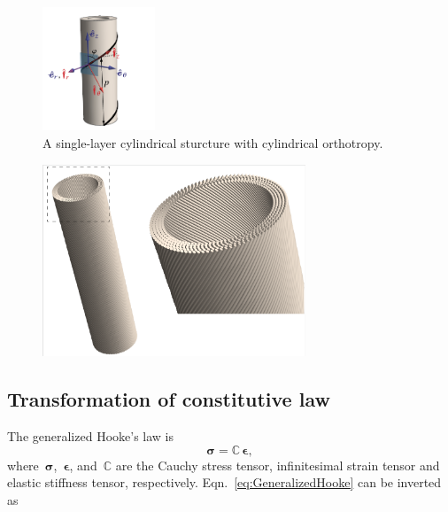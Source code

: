 \documentclass[preprint,12pt,times]{elsarticle}
\numberwithin{equation}{section}
\renewcommand{\u}[1]{\boldsymbol{#1}}
\renewcommand{\>}{$\Rightarrow$}
\begin{document}
\begin{figure}[t]
	\centering
	\graphicspath{{../LyxFiles/figure/}}
	\includegraphics[width=0.3\textwidth]{schematic_V7.pdf}
	\caption{A single-layer cylindrical sturcture with cylindrical orthotropy.
  }
	\label{fig:schematic}
\end{figure}


\begin{figure}[t]
    \centering
    \graphicspath{{../LyxFiles/figure/}}
    \includegraphics[width=0.7\textwidth]{HelixMicroStructure.png}
    \label{fig:HelixMicroStructure}
\end{figure}



\subsection{Transformation of constitutive law}
\label{sec:MatrixTrans}
The generalized Hooke's law is
\begin{equation}
\u{\sigma} = \mathbb{C}\, \u{\epsilon},
\label{eq:GeneralizedHooke}
\end{equation}
where~$\u{\sigma}$,~$\u{\epsilon}$, and~$\mathbb{C}$ are the Cauchy stress tensor, infinitesimal strain tensor and elastic stiffness tensor, respectively. Eqn.~\eqref{eq:GeneralizedHooke} can be inverted as
\end{document}
